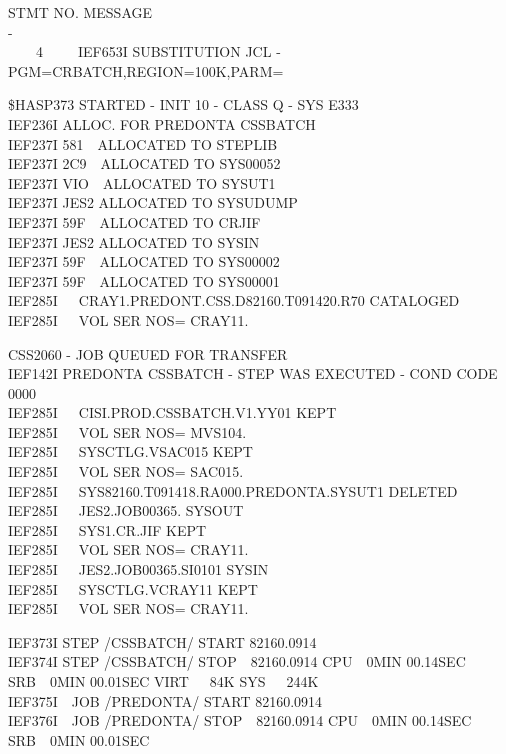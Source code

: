
{\scriptsize\ttfamily STMT NO. MESSAGE\\
-\\
~~~~4~~~~~IEF653I SUBSTITUTION JCL - PGM=CRBATCH,REGION=100K,PARM=}

{\scriptsize\ttfamily \$HASP373 STARTED - INIT 10 - CLASS Q - SYS E333\\
IEF236I ALLOC. FOR PREDONTA CSSBATCH\\
IEF237I 581~~ALLOCATED TO STEPLIB\\
IEF237I 2C9~~ALLOCATED TO SYS00052\\
IEF237I VIO~~ALLOCATED TO SYSUT1\\
IEF237I JES2 ALLOCATED TO SYSUDUMP\\
IEF237I 59F~~ALLOCATED TO CRJIF\\
IEF237I JES2 ALLOCATED TO SYSIN\\
IEF237I 59F~~ALLOCATED TO SYS00002\\
IEF237I 59F~~ALLOCATED TO SYS00001\\
IEF285I~~~CRAY1.PREDONT.CSS.D82160.T091420.R70 \quad CATALOGED\\
IEF285I~~~VOL SER NOS= CRAY11.}

{\scriptsize\ttfamily CSS2060 - JOB QUEUED FOR TRANSFER\\
IEF142I PREDONTA CSSBATCH - STEP WAS EXECUTED - COND CODE 0000\\
IEF285I~~~CISI.PROD.CSSBATCH.V1.YY01 \quad KEPT\\
IEF285I~~~VOL SER NOS= MVS104.\\
IEF285I~~~SYSCTLG.VSAC015 \quad KEPT\\
IEF285I~~~VOL SER NOS= SAC015.\\
IEF285I~~~SYS82160.T091418.RA000.PREDONTA.SYSUT1 \quad DELETED\\
IEF285I~~~JES2.JOB00365. \quad SYSOUT\\
IEF285I~~~SYS1.CR.JIF \quad KEPT\\
IEF285I~~~VOL SER NOS= CRAY11.\\
IEF285I~~~JES2.JOB00365.SI0101 \quad SYSIN\\
IEF285I~~~SYSCTLG.VCRAY11 \quad KEPT\\
IEF285I~~~VOL SER NOS= CRAY11.}

{\scriptsize\ttfamily IEF373I STEP /CSSBATCH/ START 82160.0914\\
IEF374I STEP /CSSBATCH/ STOP~~82160.0914 CPU~~0MIN 00.14SEC SRB~~0MIN 00.01SEC VIRT~~~84K SYS~~~244K\\
IEF375I~~JOB /PREDONTA/ START 82160.0914\\
IEF376I~~JOB /PREDONTA/ STOP~~82160.0914 CPU~~0MIN 00.14SEC SRB~~0MIN 00.01SEC}

